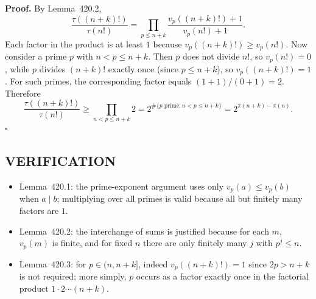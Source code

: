 \textbf{Proof.}
By Lemma~420.2,
\[
\frac{\tau((n+k)!)}{\tau(n!)}=\prod_{p\le n+k} \frac{v_p((n+k)!)+1}{v_p(n!)+1}.
\]
Each factor in the product is at least $1$ because $v_p((n+k)!)\ge v_p(n!)$.
Now consider a prime $p$ with $n<p\le n+k$.
Then $p$ does not divide $n!$, so $v_p(n!)=0$, while $p$ divides $(n+k)!$ exactly once (since $p\le n+k$), so $v_p((n+k)!)=1$.
For such primes, the corresponding factor equals $(1+1)/(0+1)=2$.
Therefore
\[
\frac{\tau((n+k)!)}{\tau(n!)}\ge \prod_{n<p\le n+k} 2 = 2^{\#\{p\text{ prime}: n<p\le n+k\}}=2^{\pi(n+k)-\pi(n)}.
\]
\hfill$\square$

\subsection*{VERIFICATION}
\begin{itemize}
\item Lemma~420.1: the prime-exponent argument uses only $v_p(a)\le v_p(b)$ when $a\mid b$; multiplying over all primes is valid because all but finitely many factors are $1$.
\item Lemma~420.2: the interchange of sums is justified because for each $m$, $v_p(m)$ is finite, and for fixed $n$ there are only finitely many $j$ with $p^j\le n$.
\item Lemma~420.3: for $p\in(n,n+k]$, indeed $v_p((n+k)!)=1$ since $2p>n+k$ is not required; more simply, $p$ occurs as a factor exactly once in the factorial product $1\cdot2\cdots(n+k)$.
\end{itemize}

